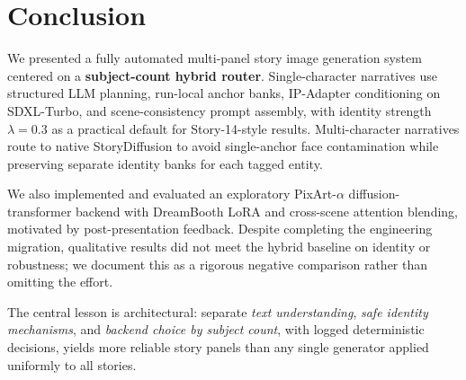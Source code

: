 \section{Conclusion}
\label{sec:conclusion}

We presented a fully automated multi-panel story image generation system centered on a \textbf{subject-count hybrid router}.
Single-character narratives use structured LLM planning, run-local anchor banks, IP-Adapter conditioning on SDXL-Turbo, and scene-consistency prompt assembly, with identity strength $\lambda=0.3$ as a practical default for Story-14-style results.
Multi-character narratives route to native StoryDiffusion to avoid single-anchor face contamination while preserving separate identity banks for each tagged entity.

We also implemented and evaluated an exploratory PixArt-$\alpha$ diffusion-transformer backend with DreamBooth LoRA and cross-scene attention blending, motivated by post-presentation feedback.
Despite completing the engineering migration, qualitative results did not meet the hybrid baseline on identity or robustness; we document this as a rigorous negative comparison rather than omitting the effort.

The central lesson is architectural: separate \emph{text understanding}, \emph{safe identity mechanisms}, and \emph{backend choice by subject count}, with logged deterministic decisions, yields more reliable story panels than any single generator applied uniformly to all stories.
